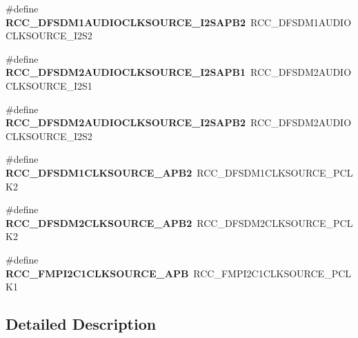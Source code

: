 \begin{DoxyCompactItemize}
\#define {\bfseries R\+C\+C\+\_\+\+D\+F\+S\+D\+M1\+A\+U\+D\+I\+O\+C\+L\+K\+S\+O\+U\+R\+C\+E\+\_\+\+I2\+S\+A\+P\+B2}~R\+C\+C\+\_\+\+D\+F\+S\+D\+M1\+A\+U\+D\+I\+O\+C\+L\+K\+S\+O\+U\+R\+C\+E\+\_\+\+I2\+S2
\item 
\mbox{\label{group___h_a_l___r_c_c___aliased_ga02a632d74c737409741d86f8997ff142}} 
\#define {\bfseries R\+C\+C\+\_\+\+D\+F\+S\+D\+M2\+A\+U\+D\+I\+O\+C\+L\+K\+S\+O\+U\+R\+C\+E\+\_\+\+I2\+S\+A\+P\+B1}~R\+C\+C\+\_\+\+D\+F\+S\+D\+M2\+A\+U\+D\+I\+O\+C\+L\+K\+S\+O\+U\+R\+C\+E\+\_\+\+I2\+S1
\item 
\mbox{\label{group___h_a_l___r_c_c___aliased_ga7b47dbfd0a1e0c7d4ebf206784d61740}} 
\#define {\bfseries R\+C\+C\+\_\+\+D\+F\+S\+D\+M2\+A\+U\+D\+I\+O\+C\+L\+K\+S\+O\+U\+R\+C\+E\+\_\+\+I2\+S\+A\+P\+B2}~R\+C\+C\+\_\+\+D\+F\+S\+D\+M2\+A\+U\+D\+I\+O\+C\+L\+K\+S\+O\+U\+R\+C\+E\+\_\+\+I2\+S2
\item 
\mbox{\label{group___h_a_l___r_c_c___aliased_ga7df532f529d9a68b1a9826b96875fc35}} 
\#define {\bfseries R\+C\+C\+\_\+\+D\+F\+S\+D\+M1\+C\+L\+K\+S\+O\+U\+R\+C\+E\+\_\+\+A\+P\+B2}~R\+C\+C\+\_\+\+D\+F\+S\+D\+M1\+C\+L\+K\+S\+O\+U\+R\+C\+E\+\_\+\+P\+C\+L\+K2
\item 
\mbox{\label{group___h_a_l___r_c_c___aliased_ga8d2ed8eb855d6ee1b6b36331192e2fd0}} 
\#define {\bfseries R\+C\+C\+\_\+\+D\+F\+S\+D\+M2\+C\+L\+K\+S\+O\+U\+R\+C\+E\+\_\+\+A\+P\+B2}~R\+C\+C\+\_\+\+D\+F\+S\+D\+M2\+C\+L\+K\+S\+O\+U\+R\+C\+E\+\_\+\+P\+C\+L\+K2
\item 
\mbox{\label{group___h_a_l___r_c_c___aliased_ga70931272f9ab715e045f7c453088839f}} 
\#define {\bfseries R\+C\+C\+\_\+\+F\+M\+P\+I2\+C1\+C\+L\+K\+S\+O\+U\+R\+C\+E\+\_\+\+A\+PB}~R\+C\+C\+\_\+\+F\+M\+P\+I2\+C1\+C\+L\+K\+S\+O\+U\+R\+C\+E\+\_\+\+P\+C\+L\+K1
\end{DoxyCompactItemize}


\subsection{Detailed Description}
